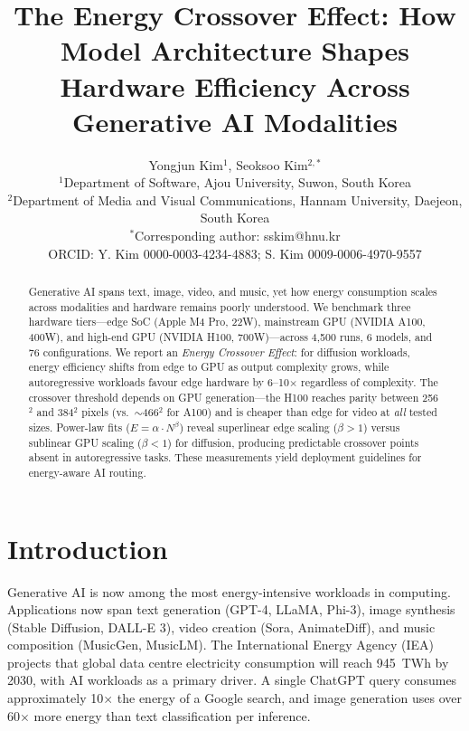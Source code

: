 \documentclass[11pt]{article}
\title{\textbf{The Energy Crossover Effect: How Model Architecture Shapes Hardware Efficiency Across Generative AI Modalities}}
\author{
  Yongjun Kim$^{1}$, Seoksoo Kim$^{2,*}$ \\[6pt]
  \small $^{1}$Department of Software, Ajou University, Suwon, South Korea \\
  \small $^{2}$Department of Media and Visual Communications, Hannam University, Daejeon, South Korea \\
  \small $^{*}$Corresponding author: sskim@hnu.kr \\
  \small ORCID: Y. Kim 0000-0003-4234-4883; S. Kim 0009-0006-4970-9557
}
\date{}
\begin{document}
\maketitle

\begin{abstract}
Generative AI spans text, image, video, and music, yet how energy consumption scales across modalities and hardware remains poorly understood. We benchmark three hardware tiers---edge SoC (Apple M4 Pro, 22W), mainstream GPU (NVIDIA A100, 400W), and high-end GPU (NVIDIA H100, 700W)---across 4,500 runs, 6 models, and 76 configurations. We report an \textit{Energy Crossover Effect}: for diffusion workloads, energy efficiency shifts from edge to GPU as output complexity grows, while autoregressive workloads favour edge hardware by 6--10$\times$ regardless of complexity. The crossover threshold depends on GPU generation---the H100 reaches parity between 256$^2$ and 384$^2$ pixels (vs.\ $\sim$466$^2$ for A100) and is cheaper than edge for video at \textit{all} tested sizes. Power-law fits ($E = \alpha \cdot N^\beta$) reveal superlinear edge scaling ($\beta > 1$) versus sublinear GPU scaling ($\beta < 1$) for diffusion, producing predictable crossover points absent in autoregressive tasks. These measurements yield deployment guidelines for energy-aware AI routing.
\end{abstract}

\section{Introduction}

Generative AI is now among the most energy-intensive workloads in computing. Applications now span text generation (GPT-4, LLaMA, Phi-3\cite{abdin2024phi3}), image synthesis (Stable Diffusion\cite{rombach2022high}, DALL-E 3), video creation (Sora, AnimateDiff\cite{guo2024animatediff}), and music composition (MusicGen\cite{copet2024musicgen}, MusicLM). The International Energy Agency (IEA) projects that global data centre electricity consumption will reach 945~TWh by 2030, with AI workloads as a primary driver\cite{iea2024}. A single ChatGPT query consumes approximately 10$\times$ the energy of a Google search\cite{devries2023growing}, and image generation uses over 60$\times$ more energy than text classification per inference\cite{luccioni2024power}.
\end{document}
